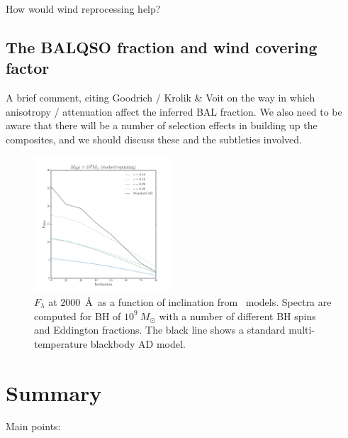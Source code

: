 \documentclass[useAMS,usenatbib]{mn2e_x}
\begin{document}
How would wind reprocessing help?

\subsection{The BALQSO fraction and wind covering factor}

A brief comment, citing Goodrich / Krolik \& Voit on the 
way in which anisotropy / attenuation affect the inferred
BAL fraction. We also need to be aware that there will be a number of selection
effects in building up the composites, and we should discuss these
and the subtleties involved. 

\begin{figure}
\centering
\includegraphics[width=0.45\textwidth]{figures/f2000_m9.png}
\caption
{
$F_\lambda$ at $2000$~\AA\ as a function of inclination from
\agn\ models. Spectra are computed for BH of $10^9~M_\odot$ with
a number of different BH spins and Eddington fractions. The black line
shows a standard multi-temperature blackbody AD model.
}
\label{fig:alpha_ox}
\end{figure}




\section{Summary}

Main points:
\end{document}
